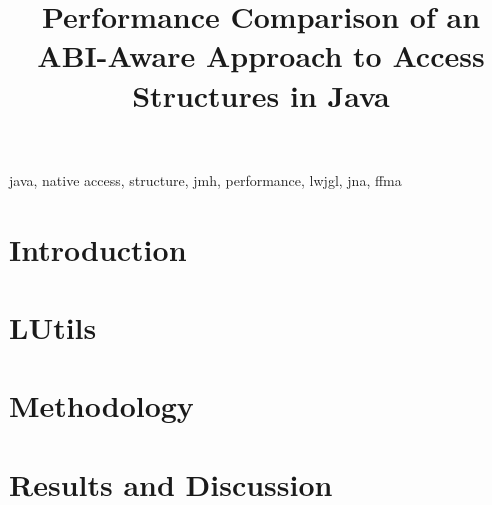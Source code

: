 \documentclass[conference]{IEEEtran}
\begin{document}


\title{
    Performance Comparison of an ABI-Aware Approach to Access Structures in Java

}

\author{
}

\maketitle

\begin{abstract}
    
\end{abstract}

\begin{IEEEkeywords}
java, native access, structure, jmh, performance, lwjgl, jna, ffma
\end{IEEEkeywords}

\section{Introduction}\label{sec:introduction}
    

\section{LUtils}\label{sec:lutils}
    

\section{Methodology}\label{sec:method}
    

\section{Results and Discussion}\label{sec:results}
    
\end{document}
